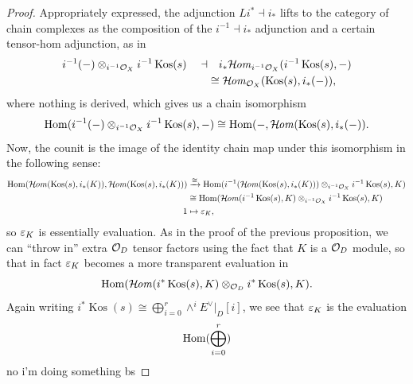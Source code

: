 \documentclass[12pt]{article}
\DeclareMathOperator{\Kos}{Kos}
\begin{document}
\begin{proof}

    Appropriately expressed, the adjunction $Li^*\dashv i_*$ lifts to the category of chain complexes as the composition of the $i^{-1}\dashv i_*$ adjunction and a certain tensor-hom adjunction, as in
    \begin{align*}
        i^{-1}(-) \otimes_{i^{-1}\cO_X} i^{-1}\Kos(s) \quad \dashv &\quad i_*\cHom_{i^{-1}\cO_X}(i^{-1}\Kos(s),-)\\
        &\cong \cHom_{\cO_X}(\Kos(s),i_*(-)),
    \end{align*}
    where nothing is derived, which gives us a chain isomorphism
    \[\Hom(i^{-1}(-)\otimes_{i^{-1}\cO_X} i^{-1}\Kos(s), -) \cong \Hom(-,\cHom(\Kos(s),i_*(-)).\]
    Now, the counit is the image of the identity chain map under this isomorphism in the following sense:
    \begin{align*}
        \Hom(\cHom(\Kos(s),i_*(K)),\cHom(\Kos(s),i_*(K))) &\xrightarrow{\cong} \Hom(i^{-1}(\cHom(\Kos(s),i_*(K)))\otimes_{i^{-1}\cO_X} i^{-1}\Kos(s),K)\\
        &\cong \Hom(\cHom(i^{-1}\Kos(s),K) \otimes_{i^{-1}\cO_X} i^{-1}\Kos(s),K)\\
        1 &\mapsto \eps_K,
    \end{align*}
    so $\varepsilon_K$ is essentially evaluation. As in the proof of the previous proposition, we can ``throw in'' extra $\mathcal{O}_D$ tensor factors using the fact that $K$ is a $\mathcal{O}_D$ module, so that in fact $\varepsilon_K$ becomes a more transparent evaluation in
    \[\Hom(\cHom(i^*\Kos(s),K)\otimes_{\cO_D} i^*\Kos(s),K).\]
    Again writing $i^*\Kos(s)\cong \bigoplus_{i=0}^r \wedge^i E^\vee|_D[i]$, we see that $\varepsilon_K$ is the evaluation
    \[\mathrm{Hom}(\bigoplus_{i=0}^r)\]
    {\color{red}no i'm doing something bs}

\end{proof}

% 

\printbibliography
\end{document}
